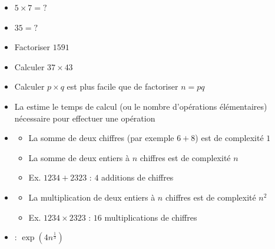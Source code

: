 \begin{frame}


\pause
\begin{itemize}
  \item $5\times7 = ?$
  \pause
  \item $35 = ?$
  \pause
  \item Factoriser $1591$
  \pause
  \item Calculer $37\times 43$
  \pause
  \item Calculer $p \times q$ est plus facile que de factoriser $n=pq$
\end{itemize}

\bigskip
\pause

\begin{itemize}
  \item La  estime le temps de calcul (ou le nombre d'opérations élémentaires)
  nécessaire pour effectuer une opération
  \pause
  
  \item {}
  \begin{itemize}
  \pause
    \item La somme de deux chiffres (par exemple $6+8$) est de complexité $1$
    \pause
    \item La somme de deux entiers à $n$ chiffres est de complexité $n$
    \pause
    \item Ex. $1234+2323$ : $4$ additions de chiffres
   \end{itemize}
  
  \pause
  \item {}
  \pause
  \begin{itemize}
    \item La multiplication de deux entiers à $n$ chiffres est de complexité $n^2$
    \pause
    \item Ex. $1234 \times 2323$ : $16$ multiplications de chiffres
   \end{itemize}
   
  \pause 
  \item {} : $\exp(4n^\frac13)$
   
\end{itemize}
\end{frame}


